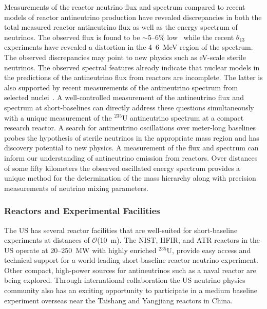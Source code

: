 Measurements of the reactor neutrino flux and spectrum compared to
recent models of reactor antineutrino production have revealed
discrepancies in both the total measured reactor antineutrino flux as
well as the energy spectrum of neutrinos. The observed flux is found
to be $\sim$5--6\% low~\cite{Mention:2011rk, Zhang:2013ela} while the
recent $\theta_{13}$ experiments have revealed a distortion in the
4--6~MeV region of the spectrum. The observed discrepancies may point
to new physics such as eV-scale sterile neutrinos. The observed
spectral features already indicate that nuclear models in the
predictions of the antineutrino flux from reactors are incomplete. The
latter is also supported by recent measurements of the antineutrino
spectrum from selected nuclei~\cite{MTAS1,MTAS2,MTAS3}. A
well-controlled measurement of the antineutrino flux and spectrum at
short-baselines can directly address these questions simultaneously
with a unique measurement of the $^{235}$U antineutrino spectrum at a
compact research reactor. A search for antineutrino oscillations over
meter-long baselines probes the hypothesis of sterile neutrinos in the
appropriate mass region and has discovery potential to new physics. A
measurement of the flux and spectrum can inform our understanding of
antineutrino emission from reactors.  Over distances of some fifty
kilometers the observed oscillated energy spectrum provides a unique
method for the determination of the mass hierarchy along with
precision measurements of neutrino mixing parameters.

\subsubsection{Reactors and Experimental Facilities}
The US has several reactor facilities that are well-suited for
short-baseline experiments at distances of $\mathcal{O}$(10~m). The
NIST, HFIR, and ATR reactors in the US operate at 20--250~MW with
highly enriched $^{235}$U, provide easy access and technical support
for a world-leading short-baseline reactor neutrino experiment. Other
compact, high-power sources for antineutrinos such as a naval
reactor are being explored. Through international collaboration the US
neutrino physics community also has an exciting opportunity to
participate in a medium baseline experiment overseas near the Taishang
and Yangjiang reactors in China.


